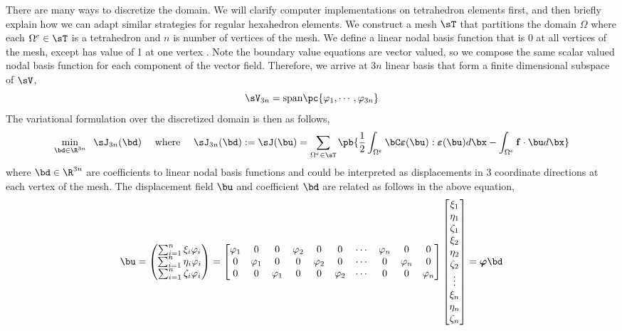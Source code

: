 \documentclass[11pt,titlepage]{article}
\newcommand{\bepsilon}{\boldsymbol{\varepsilon}}
\renewcommand{\bf}{\mathbf{f}}
\renewcommand{\bphi}{\boldsymbol{\varphi}}
\begin{document}
There are many ways to discretize the domain. We will clarify computer implementations on tetrahedron elements first, and then briefly explain how we can adapt similar strategies for regular hexahedron elements. We construct a mesh $\sT$ that partitions the domain $\Omega$ where each $\Omega^e \in\sT$ is a tetrahedron and $n$ is number of vertices of the mesh. We define a linear nodal basis function that is 0 at all vertices of the mesh, except has value of 1 at one vertex . Note the boundary value equations are vector valued, so we compose the same scalar valued nodal basis function for each component of the vector field. Therefore, we arrive at $3n$ linear basis that form a finite dimensional subspace of $\sV$,
\[
    \sV_{3n} = \text{span} \pc{
        \varphi_1, \cdots, \varphi_{3n}
    }
\]
The variational formulation over the discretized domain is then as follows,
\[
    \min_{ \bd\in \R^{3n}} \;\; \sJ_{3n}(\bd)
        \quad\text{ where }\quad
        \sJ_{3n}(\bd) := \sJ(\bu) = 
        \sum_{\Omega^e \in \sT} \pb{
            \frac{1}{2}\int_{\Omega^e} \bC \bepsilon(\bu) : \bepsilon(\bu) d\bx 
            - \int_{\Omega^e} \bf \cdot\bu d\bx
        }
\]
where $\bd\in\R^{3n}$ are coefficients to linear nodal basis functions and could be interpreted as displacements in 3 coordinate directions at each vertex of the mesh. The displacement field $\bu$ and coefficient $\bd$ are related as follows in the above equation,
\[
    \bu = 
    \begin{pmatrix}
        \sum_{i=1}^n \xi_i \varphi_i \\
        \sum_{i=1}^n \eta_i \varphi_i \\
        \sum_{i=1}^n \zeta_i \varphi_i \\
    \end{pmatrix}
    =
    \begin{bmatrix}
        \varphi_1 & 0 & 0 & \varphi_2 & 0 & 0 & \cdots & \varphi_{n} & 0 & 0 \\
        0 & \varphi_1 & 0 & 0 & \varphi_2 & 0 & \cdots & 0 & \varphi_{n} & 0 \\
        0 & 0 & \varphi_1 & 0 & 0 & \varphi_2 & \cdots & 0 & 0 & \varphi_{n} \\
    \end{bmatrix}
    \begin{bmatrix}
        \xi_1 \\ \eta_1 \\ \zeta_1 \\
        \xi_2 \\ \eta_2 \\ \zeta_2 \\
        \vdots \\
        \xi_{n} \\ \eta_{n} \\ \zeta_{n} \\
    \end{bmatrix}
    = \bphi \bd
\]
\end{document}

